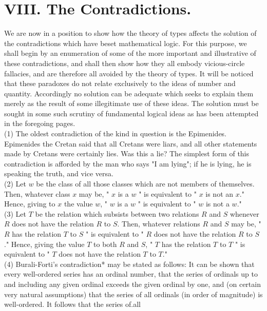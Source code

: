 \documentclass[10pt]{article}
\begin{document}
\section*{VIII. The Contradictions.}
We are now in a position to show how the theory of types affects the solution of the contradictions which have beset mathematical logic. For this purpose, we shall begin by an enumeration of some of the more important and illustrative of these contradictions, and shall then show how they all embody vicious-circle fallacies, and are therefore all avoided by the theory of types. It will be noticed that these paradoxes do not relate exclusively to the ideas of number and quantity. Accordingly no solution can be adequate which seeks to explain them merely as the result of some illegitimate use of these ideas. The solution must be sought in some such scrutiny of fundamental logical ideas as has been attempted in the foregoing pages.\\
(1) The oldest contradiction of the kind in question is the Epimenides. Epimenides the Cretan said that all Cretans were liars, and all other statements made by Cretans were certainly lies. Was this a lie? The simplest form of this contradiction is afforded by the man who says "I am lying"; if he is lying, he is speaking the truth, and vice versa.\\
(2) Let $w$ be the class of all those classes which are not members of themselves. Then, whatever class $x$ may be, " $x$ is a $w$ " is equivalent to " $x$ is not an $x$." Hence, giving to $x$ the value $w$, " $w$ is a $w$ " is equivalent to " $w$ is not a $w$."\\
(3) Let $T$ be the relation which subsists between two relations $R$ and $S$ whenever $R$ does not have the relation $R$ to $S$. Then, whatever relations $R$ and $S$ may be, " $R$ has the relation $T$ to $S$ " is equivalent to " $R$ does not have the relation $R$ to $S$." Hence, giving the value $T$ to both $R$ and $S$, " $T$ has the relation $T$ to $T$ " is equivalent to " $T$ does not have the relation $T$ to $T$."\\
(4) Burali-Forti's contradiction* may be stated as follows: It can be shown that every well-ordered series has an ordinal number, that the series of ordinals up to and including any given ordinal exceeds the given ordinal by one, and (on certain very natural assumptions) that the series of all ordinals (in order of magnitude) is well-ordered. It follows that the series of.all
\end{document}
